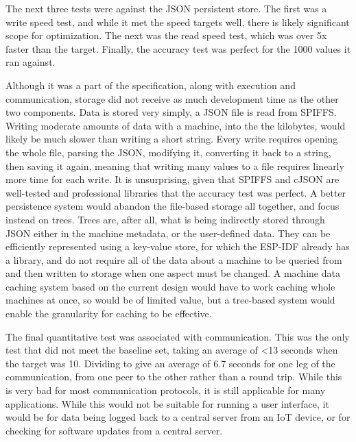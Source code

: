 \documentclass{article}
\begin{document}
The next three tests were against the JSON persistent store. The first was a write speed test, and while it met the speed targets well, there is likely significant scope for optimization. The next was the read speed test, which was over 5x faster than the target. Finally, the accuracy test was perfect for the 1000 values it ran against.

Although it was a part of the specification, along with execution and communication, storage did not receive as much development time as the other two components. Data is stored very simply, a JSON file is read from SPIFFS. Writing moderate amounts of data with a machine, into the the kilobytes, would likely be much slower than writing a short string. Every write requires opening the whole file, parsing the JSON, modifying it, converting it back to a string, then saving it again, meaning that writing many values to a file requires linearly more time for each write. It is unsurprising, given that SPIFFS and cJSON are well-tested and professional libraries that the accuracy test was perfect. A better persistence system would abandon the file-based storage all together, and focus instead on trees. Trees are, after all, what is being indirectly stored through JSON either in the machine metadata, or the user-defined data. They can be efficiently represented using a key-value store, for which the ESP-IDF already has a library, and do not require all of the data about a machine to be queried from and then written to storage when one aspect must be changed. A machine data caching system based on the current design would have to work caching whole machines at once, so would be of limited value, but a tree-based system would enable the granularity for caching to be effective.

The final quantitative test was associated with communication. This was the only test that did not meet the baseline set, taking an average of <13 seconds when the target was 10. Dividing to give an average of 6.7 seconds for one leg of the communication, from one peer to the other rather than a round trip. While this is very bad for most communication protocols, it is still applicable for many applications. While this would not be suitable for running a user interface, it would be for data being logged back to a central server from an IoT device, or for checking for software updates from a central server. 
\end{document}
